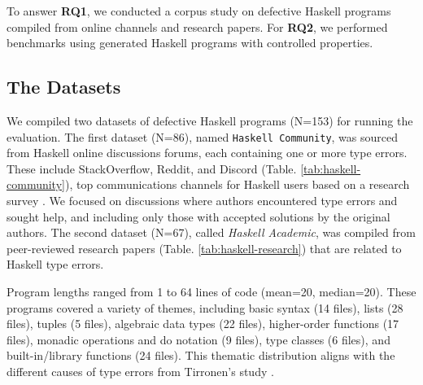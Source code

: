 \documentclass[pdflatex,sn-mathphys-num]{sn-jnl}%
\begin{document}
To answer {\bf RQ1}, we conducted a corpus study on defective Haskell programs compiled from online channels and research papers. For {\bf RQ2}, we performed benchmarks using generated Haskell programs with controlled properties.

\subsection{The Datasets} \label{sub:dataset}

We compiled two datasets of defective Haskell programs (N=153) for running the evaluation. The first dataset (N=86), named \texttt{Haskell Community}, was sourced from Haskell online discussions forums, each containing one or more type errors. These include StackOverflow, Reddit, and Discord (Table. \ref{tab:haskell-community}),  top communications channels for Haskell users based on a research survey \cite{Fausak2022-zf}. We focused on discussions where authors encountered type errors and sought help, and including only those with accepted solutions by the original authors. The second dataset (N=67), called \textit{Haskell Academic}, was compiled from peer-reviewed research papers (Table. \ref{tab:haskell-research}) that are related to Haskell type errors.

Program lengths ranged from 1 to 64 lines of code (mean=20, median=20). These programs covered a variety of themes, including basic syntax (14 files), lists (28 files), tuples (5 files), algebraic data types (22 files), higher-order functions (17 files), monadic operations and do notation (9 files), type classes (6 files), and built-in/library functions (24 files). This thematic distribution aligns with the different causes of type errors from Tirronen's study \cite{Tirronen2015-nr}.
\end{document}
